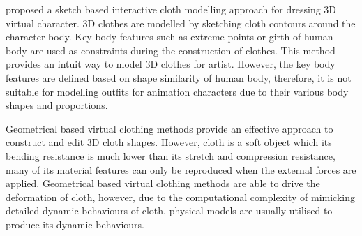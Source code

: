  proposed a sketch based interactive cloth modelling approach for dressing 3D virtual character. 3D clothes are modelled by sketching cloth contours around the character body. Key body features such as extreme points or girth of human body are used as constraints during the construction of clothes. This method provides an intuit way to model 3D clothes for artist. However, the key body features are defined based on shape similarity of human body, therefore, it is not suitable for modelling outfits for animation characters due to their various body shapes and proportions. 


%
%

Geometrical based virtual clothing methods provide an effective approach to construct and edit 3D cloth shapes. However, cloth is a soft object which its bending resistance is much lower than its stretch and compression resistance, many of its material features can only be reproduced when the external forces are applied. Geometrical based virtual clothing methods are able to drive the deformation of cloth, however, due to the computational complexity of mimicking detailed dynamic behaviours of cloth, physical models are usually utilised to produce its dynamic behaviours.

